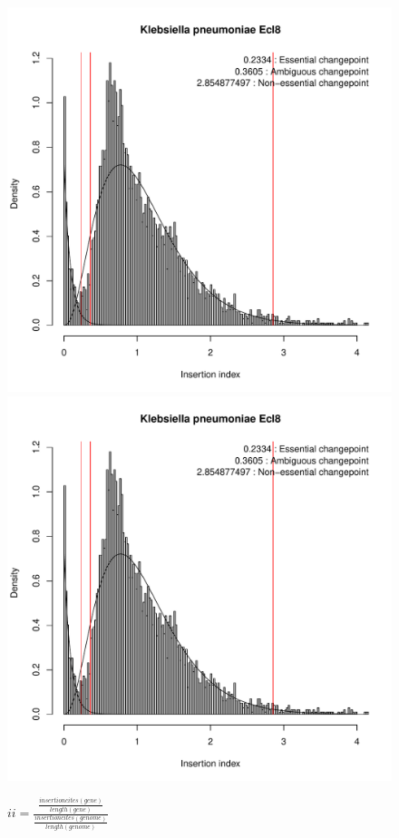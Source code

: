 \documentclass[a4paper,10pt]{article}
\begin{document}
\begin{figure}
\includegraphics[scale=0.2, page=11]{mixtools.pdf}
\includegraphics[scale=0.2, page=12]{mixtools.pdf}
\caption{$ii=\frac{\frac{insertioncites(gene)}{length(gene)}}{\frac{insertioncites(genome)}{length(genome)}}$\newline
}
\end{figure}
\end{document}
